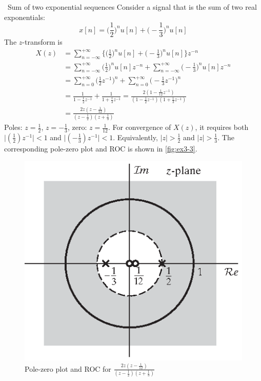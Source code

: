 \begin{ex}{ \ Sum of two exponential sequences}
    Consider a signal that is the sum of two real exponentials:
    \[
    x[n] = \bigg( \frac{1}{2} \bigg)^{n} u[n] + \bigg( -\frac{1}{3} \bigg)^{n} u[n]
    \]
    The $z$-transform is 
    \begin{align*}
        X(z) 
        & = \sum_{n=-\infty}^{+\infty} \bigg\{ \bigg( \frac{1}{2} \bigg)^{n} u[n] + \bigg( -\frac{1}{3} \bigg)^{n} u[n] \bigg\} z^{-n} \\
        & = \sum_{n=-\infty}^{+\infty} \bigg( \frac{1}{2} \bigg)^{n} u[n] z^{-n} +  \sum_{n=-\infty}^{+\infty}\bigg( -\frac{1}{3} \bigg)^{n} u[n] z^{-n} \\
        & = \sum_{n=0}^{+\infty} \bigg( \frac{1}{2} z^{-1} \bigg)^{n} +  \sum_{n=0}^{+\infty} \bigg( -\frac{1}{3} z^{-1} \bigg)^{n} \\
        & = \frac{1}{1-\frac{1}{2}z^{-1}} + \frac{1}{1+\frac{1}{3}z^{-1}} = \frac{2(1-\frac{1}{12}z^{-1})}{(1-\frac{1}{2}z^{-1})(1+\frac{1}{3}z^{-1})} \\
        & = \boxed{\frac{2z(z-\frac{1}{12})}{(z-\frac{1}{2})(z+\frac{1}{3})}}
    \end{align*}
    Poles: $z=\frac{1}{2}$, $z=-\frac{1}{3}$, zero: $z=\frac{1}{12}$. For convergence of $X(z)$, it requires both $\displaystyle \bigg\lvert (\frac{1}{2})z^{-1}\bigg\rvert < 1$ and $\displaystyle \bigg\lvert (-\frac{1}{3})z^{-1}\bigg\rvert < 1$. Equivalently, $\lvert z \rvert >\frac{1}{2}$ and $\lvert z \rvert >\frac{1}{3}$. The corresponding pole-zero plot and ROC is shown in \autoref{fig:ex3-3}.
    \begin{figure}[H]
        \centering
        \includegraphics{images/example3-3.eps}
        \caption{Pole-zero plot and ROC for $\frac{2z(z-\frac{1}{12})}{(z-\frac{1}{2})(z+\frac{1}{3})}$}
        \label{fig:ex3-3}
    \end{figure}


\end{ex}
